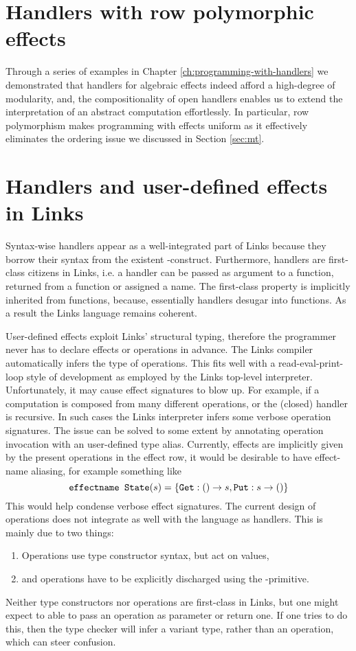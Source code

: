 \section{Handlers with row polymorphic effects}\label{sec:eval-abs}
Through a series of examples in Chapter \ref{ch:programming-with-handlers} we demonstrated that handlers for algebraic effects indeed afford a high-degree of modularity, and, the compositionality of open handlers enables us to extend the interpretation of an abstract computation effortlessly. In particular, row polymorphism makes programming with effects uniform as it effectively eliminates the ordering issue we discussed in Section \ref{sec:mt}.

\section{Handlers and user-defined effects in Links}
Syntax-wise handlers appear as a well-integrated part of Links because they borrow their syntax from the existent -construct.
Furthermore, handlers are first-class citizens in Links, i.e. a handler can be passed as argument to a function, returned from a function or assigned a name. The first-class property is implicitly inherited from functions, because, essentially handlers desugar into functions.
As a result the Links language remains coherent.

User-defined effects exploit Links' structural typing, therefore the programmer never has to declare effects or operations in advance. The Links compiler automatically infers the type of operations. This fits well with a read-eval-print-loop style of development as employed by the Links top-level interpreter. Unfortunately, it may cause effect signatures to blow up. For example, if a computation is composed from many different operations, or the (closed) handler is recursive. In such cases the Links interpreter infers some verbose operation signatures. The issue can be solved to some extent by annotating operation invocation with an user-defined type alias. Currently, effects are implicitly given by the present operations in the effect row, it would be desirable to have effect-name aliasing, for example something like
\[ \texttt{effectname State}(s) = \{\texttt{Get}: () \to s, \texttt{Put}: s \to ()\} \]
This would help condense verbose effect signatures. The current design of operations does not integrate as well with the language as handlers. This is mainly due to two things:
\begin{enumerate}
  \item Operations use type constructor syntax, but act on values,
  \item and operations have to be explicitly discharged using the -primitive.
\end{enumerate}
Neither type constructors nor operations are first-class in Links, but one might expect to able to pass an operation as parameter or return one. If one tries to do this, then the type checker will infer a variant type, rather than an operation, which can steer confusion.

